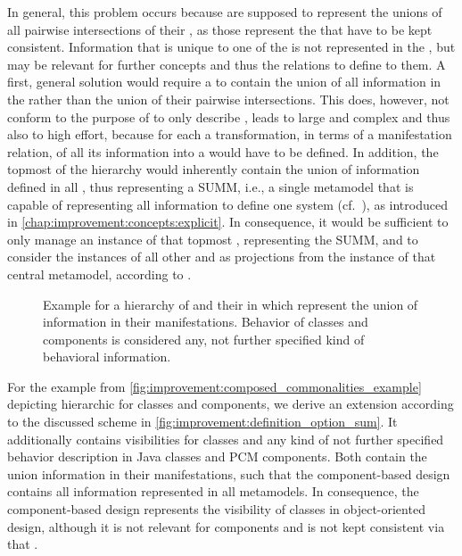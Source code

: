 In general, this problem occurs because \conceptmetamodels are supposed to represent the unions of all pairwise intersections of their \concretemetamodels, as those represent the \commonalities that have to be kept consistent.
Information that is unique to one of the \concretemetamodels is not represented in the \conceptmetamodel, but may be relevant for further concepts and thus the relations to define to them.
A first, general solution would require a \conceptmetamodel to contain the union of all information in the \concretemetamodels rather than the union of their pairwise intersections.
This does, however, not conform to the purpose of \conceptmetamodels to only describe \commonalities, leads to large and complex \conceptmetamodels and thus also to high effort, because for each \concretemetamodel a transformation, in terms of a manifestation relation, of all its information into a \conceptmetamodel would have to be defined.
In addition, the topmost \conceptmetamodel of the hierarchy would inherently contain the union of information defined in all \conceptmetamodels, thus representing a \gls{SUMM}, i.e., a single metamodel that is capable of representing all information to define one system (cf.~\cite[Def. 2]{klare2020Vitruv-JSS}), as introduced in \autoref{chap:improvement:concepts:explicit}.
In consequence, it would be sufficient to only manage an instance of that topmost \conceptmetamodel, representing the \gls{SUMM}, and to consider the instances of all other \conceptmetamodels and \concretemetamodels as projections from the instance of that central metamodel, according to \textcite{atkinson2010a}.

\begin{figure}
    \centering
    
    \caption[\Commonalities with union of all information]{Example for a hierarchy of \conceptmetamodels and their \commonalities in which \conceptmetamodels represent the union of information in their manifestations. Behavior of classes and components is considered any, not further specified kind of behavioral information.}
    \label{fig:improvement:definition_option_sum}
\end{figure}

For the example from \autoref{fig:improvement:composed_commonalities_example} depicting hierarchic \conceptmetamodels for classes and components, we derive an extension according to the discussed scheme in \autoref{fig:improvement:definition_option_sum}.
It additionally contains visibilities for classes and any kind of not further specified behavior description in Java classes and \gls{PCM} components.
Both \conceptmetamodels contain the union information in their manifestations, such that the component-based design \conceptmetamodel contains all information represented in all metamodels.
In consequence, the component-based design \conceptmetamodel represents the visibility of classes in object-oriented design, although it is not relevant for components and is not kept consistent via that \conceptmetamodel.

